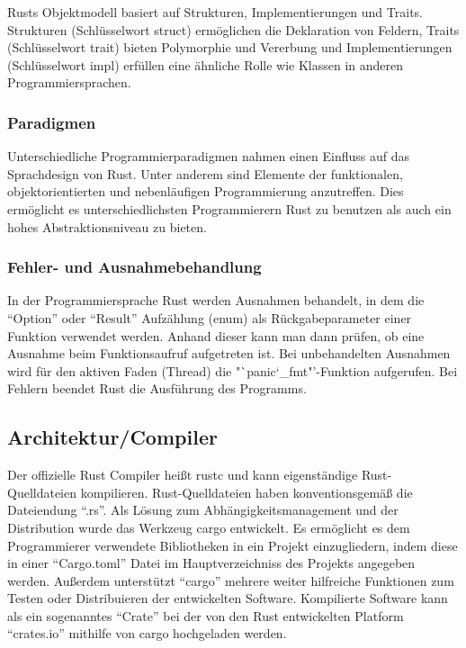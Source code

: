 Rusts Objektmodell basiert auf Strukturen, Implementierungen und Traits\cite{rustWikiEn}.
Strukturen (Schlüsselwort struct) ermöglichen die Deklaration von Feldern\cite{rustWikiEn}, 
Traits (Schlüsselwort trait) bieten Polymorphie und Vererbung
\cite{rustWikiEn} und Implementierungen (Schlüsselwort impl) erfüllen eine ähnliche Rolle wie Klassen in
anderen Programmiersprachen\cite{rustWikiEn}.

\subsubsection{Paradigmen}

Unterschiedliche Programmierparadigmen nahmen einen Einfluss auf das Sprachdesign von Rust\cite{rustWikiDe}.
Unter anderem sind Elemente der funktionalen, objektorientierten und nebenläufigen Programmierung anzutreffen\cite{rustWikiDe}.
Dies ermöglicht es unterschiedlichsten Programmierern Rust zu benutzen als auch ein hohes Abstraktionsniveau zu
bieten\cite{rustWikiDe}.

\subsubsection{Fehler- und Ausnahmebehandlung}

In der Programmiersprache Rust werden Ausnahmen behandelt, in dem die "`Option"' oder "`Result"' Aufzählung (enum) als
Rückgabeparameter einer Funktion verwendet werden. Anhand dieser kann man dann prüfen, ob eine Ausnahme beim Funktionsaufruf
aufgetreten ist. Bei unbehandelten Ausnahmen wird für den aktiven Faden (Thread) die "`panic\char`_fmt"'-Funktion aufgerufen.
Bei Fehlern beendet Rust die Ausführung des Programms. 

\subsection{Architektur/Compiler}

Der offizielle Rust Compiler heißt rustc und kann eigenständige Rust-Quelldateien kompilieren. Rust-Quelldateien haben
konventionsgemäß die Dateiendung "`.rs"'. Als Lösung zum Abhängigkeitsmanagement und der Distribution wurde das Werkzeug cargo 
entwickelt. Es ermöglicht es dem Programmierer verwendete Bibliotheken in ein Projekt einzugliedern,
indem diese in einer "`Cargo.toml"' Datei im Hauptverzeichniss
des Projekts angegeben werden. Außerdem unterstützt "`cargo"' mehrere weiter hilfreiche Funktionen zum Testen oder
Distribuieren der entwickelten Software. Kompilierte Software kann als ein sogenanntes "`Crate"' bei der
von den Rust entwickelten Platform "`crates.io"' mithilfe von cargo hochgeladen werden.

